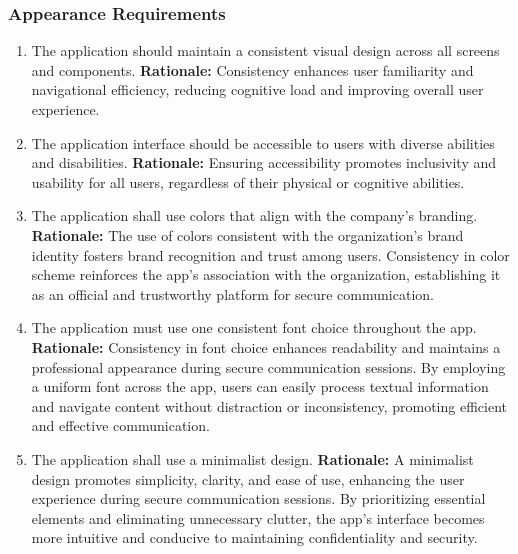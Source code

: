 \documentclass[]{article}
\begin{document}
\subsubsection{Appearance Requirements}
\label{ssub:appearance_requirements}
\begin{enumerate}[{LF-A}1. ]
	\item The application should maintain a consistent visual design across all screens and components. \newline
	      \textbf{Rationale:} Consistency enhances user familiarity and navigational efficiency, reducing cognitive load and improving overall user experience.
	\item The application interface should be accessible to users with diverse abilities and disabilities. \newline
	      \textbf{Rationale:} Ensuring accessibility promotes inclusivity and usability for all users, regardless of their physical or cognitive abilities.
	\item The application shall use colors that align with the company’s branding. \newline
	      \textbf{Rationale:} The use of colors consistent with the organization's brand identity fosters brand recognition and trust among users. Consistency in color scheme reinforces the app's association with the organization, establishing it as an official and trustworthy platform for secure communication.
	\item The application must use one consistent font choice throughout the app. \newline
	      \textbf{Rationale:} Consistency in font choice enhances readability and maintains a professional appearance during secure communication sessions. By employing a uniform font across the app, users can easily process textual information and navigate content without distraction or inconsistency, promoting efficient and effective communication.
	\item The application shall use a minimalist design. \newline
	      \textbf{Rationale:} A minimalist design promotes simplicity, clarity, and ease of use, enhancing the user experience during secure communication sessions. By prioritizing essential elements and eliminating unnecessary clutter, the app's interface becomes more intuitive and conducive to maintaining confidentiality and security.
\end{enumerate}
\end{document}
